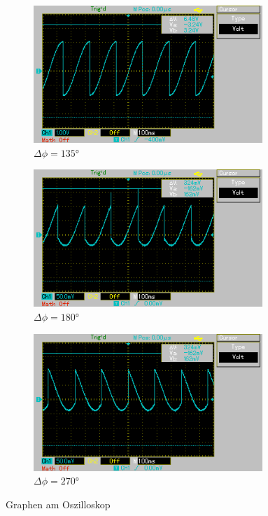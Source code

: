 \begin{figure}
  \begin{subfigure}{0.32\textwidth}
    \centering
    \includegraphics[width=0.95\textwidth]{content/135deg.png}
    \caption{$\Delta\phi = 135°$}
    \label{fig:135-deg}
  \end{subfigure}
  \begin{subfigure}{0.32\textwidth}
    \centering
    \includegraphics[width=0.95\textwidth]{content/180deg.png}
    \caption{$\Delta\phi = 180°$}
    \label{fig:180-deg}
  \end{subfigure}
  \begin{subfigure}{0.32\textwidth}
    \centering
    \includegraphics[width=0.95\textwidth]{content/270deg.png}
    \caption{$\Delta\phi = 270°$}
    \label{fig:270-deg}
  \end{subfigure}
  \label{fig:Graphen}
  \caption{Graphen am Oszilloskop}
\end{figure}

